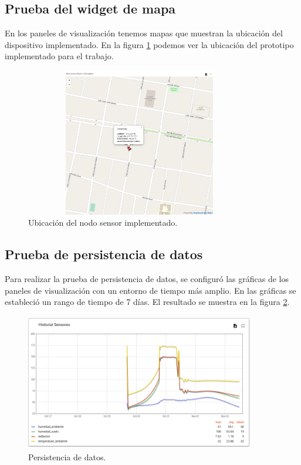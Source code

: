 \subsection{Prueba del widget de mapa}
En los paneles de visualización tenemos mapas que muestran la ubicación del dispositivo implementado.
En la figura \ref{fig:map thingsboard}  podemos ver la ubicación del prototipo implementado para el trabajo.

\begin{figure}[h!]
  \centering
    \includegraphics[width=10cm, height=6.5cm]{./Figures/map.png}
  \caption{Ubicación del nodo sensor implementado.}
    \label{fig:map thingsboard}
\end{figure}

\subsection{Prueba de persistencia de datos}
Para realizar la prueba de persistencia de datos, se configuró las gráficas de los paneles de visualización con un entorno de tiempo más amplio.
En las gráficas se estableció un rango de tiempo de 7 días. El resultado se muestra en la figura \ref{fig:Persistencia de datos}.

\begin{figure}[h!]
  \centering
    \includegraphics[width=10cm, height=6cm]{./Figures/persistencia_datos.png}
  \caption{Persistencia de datos.}
    \label{fig:Persistencia de datos}
\end{figure}

